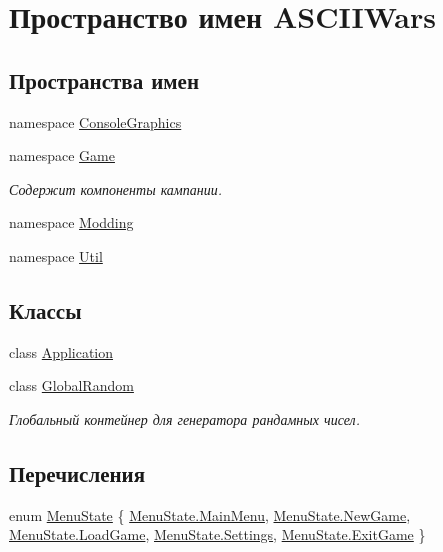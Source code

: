 \hypertarget{namespace_a_s_c_i_i_wars}{}\section{Пространство имен A\+S\+C\+I\+I\+Wars}
\label{namespace_a_s_c_i_i_wars}
\subsection*{Пространства имен}
\begin{DoxyCompactItemize}
\item 
namespace \hyperlink{namespace_a_s_c_i_i_wars_1_1_console_graphics}{Console\+Graphics}
\item 
namespace \hyperlink{namespace_a_s_c_i_i_wars_1_1_game}{Game}
\begin{DoxyCompactList}\small\item\em Содержит компоненты кампании. \end{DoxyCompactList}\item 
namespace \hyperlink{namespace_a_s_c_i_i_wars_1_1_modding}{Modding}
\item 
namespace \hyperlink{namespace_a_s_c_i_i_wars_1_1_util}{Util}
\end{DoxyCompactItemize}
\subsection*{Классы}
\begin{DoxyCompactItemize}
\item 
class \hyperlink{class_a_s_c_i_i_wars_1_1_application}{Application}
\item 
class \hyperlink{class_a_s_c_i_i_wars_1_1_global_random}{Global\+Random}
\begin{DoxyCompactList}\small\item\em Глобальный контейнер для генератора рандамных чисел. \end{DoxyCompactList}\end{DoxyCompactItemize}
\subsection*{Перечисления}
\begin{DoxyCompactItemize}
\item 
enum \hyperlink{namespace_a_s_c_i_i_wars_a9b8588e75dba14ac63aa79a49dd5a4eb}{Menu\+State} \{ \newline
\hyperlink{namespace_a_s_c_i_i_wars_a9b8588e75dba14ac63aa79a49dd5a4ebaad1111b48f98329333237912fc3b371b}{Menu\+State.\+Main\+Menu}, 
\hyperlink{namespace_a_s_c_i_i_wars_a9b8588e75dba14ac63aa79a49dd5a4eba31947c4eece1b08b70e9ba88dae24416}{Menu\+State.\+New\+Game}, 
\hyperlink{namespace_a_s_c_i_i_wars_a9b8588e75dba14ac63aa79a49dd5a4eba1613dbfa6c7c385e7aea951a03f93f58}{Menu\+State.\+Load\+Game}, 
\hyperlink{namespace_a_s_c_i_i_wars_a9b8588e75dba14ac63aa79a49dd5a4ebaf4f70727dc34561dfde1a3c529b6205c}{Menu\+State.\+Settings}, 
\newline
\hyperlink{namespace_a_s_c_i_i_wars_a9b8588e75dba14ac63aa79a49dd5a4eba4166c4566d4ee3c335e2f09f7f0d5d0b}{Menu\+State.\+Exit\+Game}
 \}
\end{DoxyCompactItemize}



